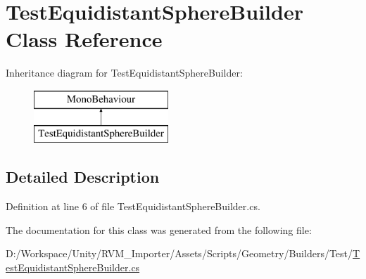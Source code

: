 \hypertarget{class_test_equidistant_sphere_builder}{}\section{Test\+Equidistant\+Sphere\+Builder Class Reference}
\label{class_test_equidistant_sphere_builder}
Inheritance diagram for Test\+Equidistant\+Sphere\+Builder\+:\begin{figure}[H]
\begin{center}
\leavevmode
\includegraphics[height=2.000000cm]{class_test_equidistant_sphere_builder}
\end{center}
\end{figure}


\subsection{Detailed Description}


Definition at line 6 of file Test\+Equidistant\+Sphere\+Builder.\+cs.



The documentation for this class was generated from the following file\+:\begin{DoxyCompactItemize}
\item 
D\+:/\+Workspace/\+Unity/\+R\+V\+M\+\_\+\+Importer/\+Assets/\+Scripts/\+Geometry/\+Builders/\+Test/\mbox{\hyperlink{_test_equidistant_sphere_builder_8cs}{Test\+Equidistant\+Sphere\+Builder.\+cs}}\end{DoxyCompactItemize}

